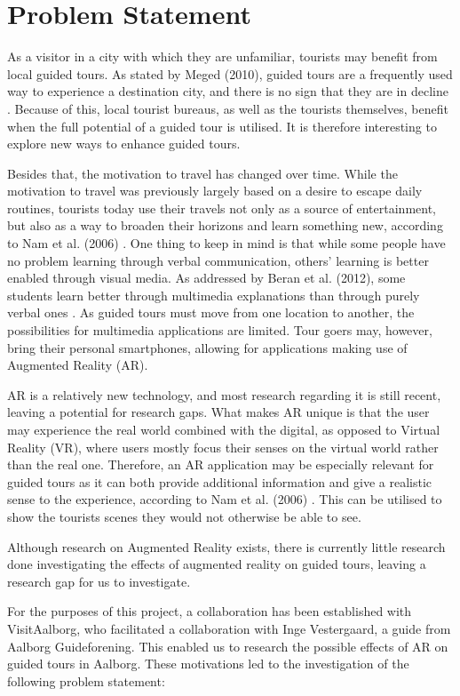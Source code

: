 \chapter{Problem Statement}\label{ch:problemstatement}
As a visitor in a city with which they are unfamiliar, tourists may benefit from local guided tours. As stated by Meged (2010), guided tours are a frequently used way to experience a destination city, and there is no sign that they are in decline \cite{Meged2010}. Because of this, local tourist bureaus, as well as the tourists themselves, benefit when the full potential of a guided tour is utilised. It is therefore interesting to explore new ways to enhance guided tours. 

Besides that, the motivation to travel has changed over time. While the motivation to travel was previously largely based on a desire to escape daily routines, tourists today use their travels not only as a source of entertainment, but also as a way to broaden their horizons and learn something new, according to Nam et al. (2006) \cite{Nam2006}. One thing to keep in mind is that while some people have no problem learning through verbal communication, others' learning is better enabled through visual media. As addressed by Beran et al. (2012), some students learn better through multimedia explanations than through purely verbal ones \cite{Beran2012}. As guided tours must move from one location to another, the possibilities for multimedia applications are limited. Tour goers may, however, bring their personal smartphones, allowing for applications making use of Augmented Reality (AR).

AR is a relatively new technology, and most research regarding it is still recent, leaving a potential for research gaps. What makes AR unique is that the user may experience the real world combined with the digital, as opposed to Virtual Reality (VR), where users mostly focus their senses on the virtual world rather than the real one. Therefore, an AR application may be especially relevant for guided tours as it can both provide additional information and give a realistic sense to the experience, according to Nam et al. (2006) \cite{Nam2006}. This can be utilised to show the tourists scenes they would not otherwise be able to see.

Although research on Augmented Reality exists, there is currently little research done investigating the effects of augmented reality on guided tours, leaving a research gap for us to investigate.

For the purposes of this project, a collaboration has been established with VisitAalborg, who facilitated a collaboration with Inge Vestergaard, a guide from Aalborg Guideforening. This enabled us to research the possible effects of AR on guided tours in Aalborg. These motivations led to the investigation of the following problem statement:

